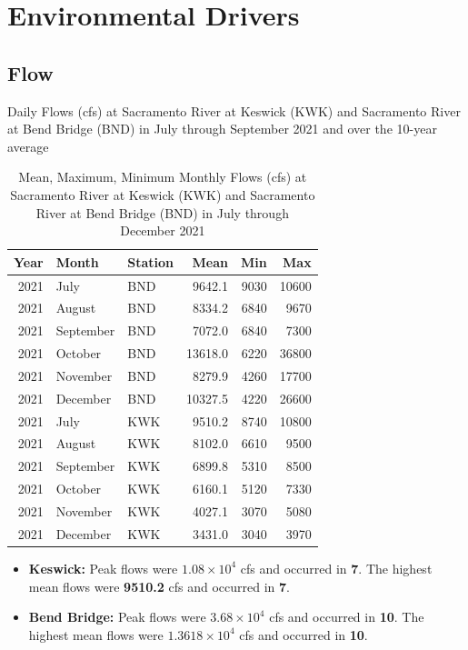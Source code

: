\documentclass[
]{book}
\providecommand{\tightlist}{%
  \setlength{\itemsep}{0pt}\setlength{\parskip}{0pt}}
\theoremstyle{definition}
\theoremstyle{definition}
\theoremstyle{definition}
\theoremstyle{definition}
\theoremstyle{remark}
\begin{document}
\hypertarget{environmental-drivers-1}{%
\section{Environmental Drivers}\label{environmental-drivers-1}}

\hypertarget{flow}{%
\subsection{Flow}\label{flow}}

\label{fig:KWKBNDflowjuv-fig}Daily Flows (cfs) at Sacramento River at Keswick (KWK) and Sacramento River at Bend Bridge (BND) in July through September 2021 and over the 10-year average

\begin{table}
\centering
\caption{Mean, Maximum, Minimum Monthly Flows (cfs) at Sacramento River at Keswick (KWK) and Sacramento River at Bend Bridge (BND) in July through December 2021}
\centering
\begin{tabular}[t]{rllrrr}
\hline
Year & Month & Station & Mean & Min & Max\\
\hline
2021 & July & BND & 9642.1 & 9030 & 10600\\
\hline
2021 & August & BND & 8334.2 & 6840 & 9670\\
\hline
2021 & September & BND & 7072.0 & 6840 & 7300\\
\hline
2021 & October & BND & 13618.0 & 6220 & 36800\\
\hline
2021 & November & BND & 8279.9 & 4260 & 17700\\
\hline
2021 & December & BND & 10327.5 & 4220 & 26600\\
\hline
2021 & July & KWK & 9510.2 & 8740 & 10800\\
\hline
2021 & August & KWK & 8102.0 & 6610 & 9500\\
\hline
2021 & September & KWK & 6899.8 & 5310 & 8500\\
\hline
2021 & October & KWK & 6160.1 & 5120 & 7330\\
\hline
2021 & November & KWK & 4027.1 & 3070 & 5080\\
\hline
2021 & December & KWK & 3431.0 & 3040 & 3970\\
\hline
\end{tabular}
\end{table}

\begin{itemize}
\tightlist
\item
  \textbf{Keswick:} Peak flows were \textbf{\ensuremath{1.08\times 10^{4}}} cfs and occurred in \textbf{7}. The highest mean flows were \textbf{9510.2} cfs and occurred in \textbf{7}.
\item
  \textbf{Bend Bridge:} Peak flows were \textbf{\ensuremath{3.68\times 10^{4}}} cfs and occurred in \textbf{10}. The highest mean flows were \textbf{\ensuremath{1.3618\times 10^{4}}} cfs and occurred in \textbf{10}.
\end{itemize}
\end{document}
